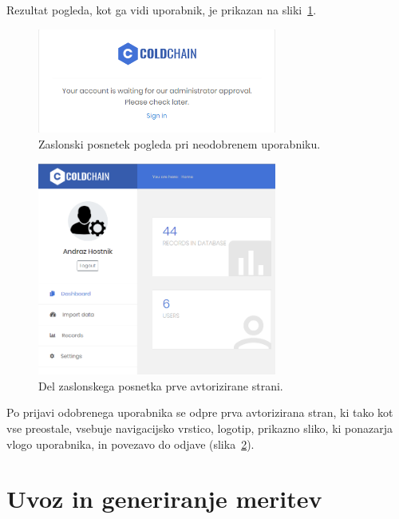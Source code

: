 \documentclass[a4paper, 12pt]{book}
\begin{document}
Rezultat pogleda, kot ga vidi uporabnik, je prikazan na sliki~\ref{ss-approval}.

\begin{figure}[h]
\begin{center}
\includegraphics[width=0.7\textwidth]{slike/approval.png}
\end{center}
\caption{Zaslonski posnetek pogleda pri neodobrenem uporabniku.}
\label{ss-approval}
\end{figure}

\newpage

\begin{figure}[h]
\begin{center}
\includegraphics[width=0.7\textwidth]{slike/logout.png}
\end{center}
\caption{Del zaslonskega posnetka prve avtorizirane strani.}
\label{ss-logout}
\end{figure}

Po prijavi odobrenega uporabnika se odpre prva avtorizirana stran, ki tako kot vse preostale, vsebuje navigacijsko vrstico, logotip, prikazno sliko, ki ponazarja vlogo uporabnika, in povezavo do odjave (slika~\ref{ss-logout}).

\section{Uvoz in generiranje meritev}
\label{uvoz-in-generiranje-meritev}
\end{document}
